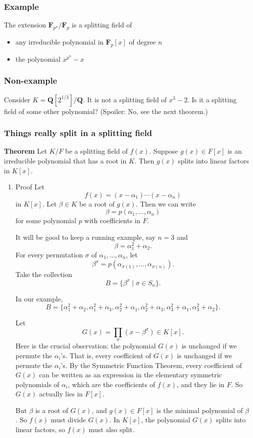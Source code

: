 \documentclass[11pt]{article}
\begin{document}
\subsubsection{Example}
\label{sec:org5ba2827}
The extension \(\mathbf{F}_{p^{n}}/ \mathbf{F}_p\) is a splitting field of
\begin{itemize}
\item any irreducible polynomial in \(\mathbf{F}_p[x]\) of degree \(n\)
\item the polynomial \(x^{p^n}-x\)
\end{itemize}
\subsubsection{Non-example}
\label{sec:org5ce2fb8}
Consider \(K = \mathbf{Q}[2^{1/3}] / \mathbf{Q}\).
It is not a splitting field of \(x^3-2\).
Is it a splitting field of some other polynomial? (Spoiler: No, see the next theorem.)
\subsubsection{Things really split in a splitting field}
\label{sec:orgbf37b52}

\textbf{Theorem} Let \(K/F\) be a splitting field of \(f(x)\).
Suppose \(g(x) \in F[x]\) is an irreducible polynomial that has a root in \(K\).
Then \(g(x)\) splits into linear factors in \(K[x]\).
\begin{enumerate}
\item Proof
\label{sec:org6ed2231}
Let
\[ f(x) = (x-\alpha_{1}) \cdots (x-\alpha_{n})\]
in \(K[x]\).
Let \(\beta \in K\) be a root of \(g(x)\).
Then we can write
\[ \beta = p(\alpha_1, \dots, \alpha_{n})\]
for some polynomial \(p\) with coefficients in \(F\).

It will be good to keep a running example, say \(n = 3\) and
\[ \beta = \alpha_{1}^2 + \alpha_{2}.\]
For every permutation \(\sigma\) of \(\alpha_{1}, \dots, \alpha_{n}\), let
\[ \beta^{\sigma} = p(\alpha_{\sigma(1)}, \dots, \alpha_{\sigma(n)}).\]
Take the collection
\[ B = \{\beta^{\sigma} \mid \sigma \in S_{n}\}.\]

In our example,
\[ B = \{\alpha_{1}^2+\alpha_{2}, \alpha_{1}^2+\alpha_{3}, \alpha_{2}^2+\alpha_{1}, \alpha_{2}^2+\alpha_{3}, \alpha_{3}^2+\alpha_{1}, \alpha_{3}^2+\alpha_{2}\}.\]

Let
\[ G(x) = \prod_{\sigma}(x-\beta^{\sigma}) \in K[x].\]
Here is the crucial observation: the polynomial \(G(x)\) is unchanged if we permute the \(\alpha_{i}\)'s.
That is, every coefficient of \(G(x)\) is unchanged if we permute the \(\alpha_{i}\)'s.
By the Symmetric Function Theorem, every coefficient of \(G(x)\) can be written as an expression in the elementary symmetric polynomials of \(\alpha_{i}\), which are the coefficients of \(f(x)\), and they lie in \(F\).
So \(G(x)\) actually lies in \(F[x]\).

But \(\beta\) is a root of \(G(x)\), and \(g(x) \in F[x]\) is the minimal polynomial of \(\beta\).
So \(f(x)\) must divide \(G(x)\).
In \(K[x]\), the polynomial \(G(x)\) splits into linear factors, so \(f(x)\) must also split.
\end{enumerate}
\end{document}
